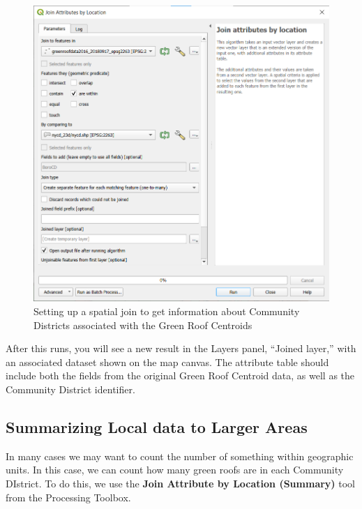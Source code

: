 \documentclass[
  letterpaper,
  DIV=11,
  numbers=noendperiod]{scrreprt}
\begin{document}
\begin{figure}

{\centering \includegraphics{./images/CommDist_to_GreenRoofs_Setup.png}

}

\caption{Setting up a spatial join to get information about Community
Districts associated with the Green Roof Centroids}

\end{figure}

After this runs, you will see a new result in the Layers panel, ``Joined
layer,'' with an associated dataset shown on the map canvas. The
attribute table should include both the fields from the original Green
Roof Centroid data, as well as the Community District identifier.

\hypertarget{summarizing-local-data-to-larger-areas}{%
\subsection{Summarizing Local data to Larger
Areas}\label{summarizing-local-data-to-larger-areas}}

In many cases we may want to count the number of something within
geographic units. In this case, we can count how many green roofs are in
each Community DIstrict. To do this, we use the \textbf{Join Attribute
by Location (Summary)} tool from the Processing Toolbox.
\end{document}
